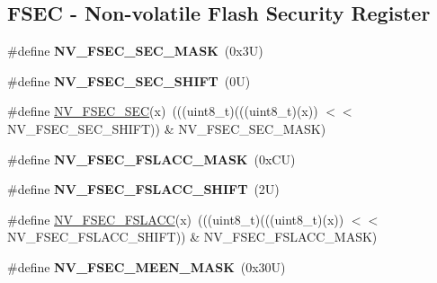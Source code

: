 \subsection*{F\+S\+EC -\/ Non-\/volatile Flash Security Register}
\begin{DoxyCompactItemize}
\item 
\mbox{\label{group___n_v___register___masks_gab159c721c6cde1f629b630c573da8ea9}} 
\#define {\bfseries N\+V\+\_\+\+F\+S\+E\+C\+\_\+\+S\+E\+C\+\_\+\+M\+A\+SK}~(0x3\+U)
\item 
\mbox{\label{group___n_v___register___masks_ga92a819b24b0472a83857ddd2d950ab08}} 
\#define {\bfseries N\+V\+\_\+\+F\+S\+E\+C\+\_\+\+S\+E\+C\+\_\+\+S\+H\+I\+FT}~(0\+U)
\item 
\#define \mbox{\hyperlink{group___n_v___register___masks_ga285ae0f5ea99f97dfae69dc7affebcde}{N\+V\+\_\+\+F\+S\+E\+C\+\_\+\+S\+EC}}(x)~(((uint8\+\_\+t)(((uint8\+\_\+t)(x)) $<$$<$ N\+V\+\_\+\+F\+S\+E\+C\+\_\+\+S\+E\+C\+\_\+\+S\+H\+I\+FT)) \& N\+V\+\_\+\+F\+S\+E\+C\+\_\+\+S\+E\+C\+\_\+\+M\+A\+SK)
\item 
\mbox{\label{group___n_v___register___masks_ga8fd3b6696c82aa96017fe25be34d19c9}} 
\#define {\bfseries N\+V\+\_\+\+F\+S\+E\+C\+\_\+\+F\+S\+L\+A\+C\+C\+\_\+\+M\+A\+SK}~(0x\+C\+U)
\item 
\mbox{\label{group___n_v___register___masks_gaba549ee99b8ca1af3531eafd5746f6b6}} 
\#define {\bfseries N\+V\+\_\+\+F\+S\+E\+C\+\_\+\+F\+S\+L\+A\+C\+C\+\_\+\+S\+H\+I\+FT}~(2\+U)
\item 
\#define \mbox{\hyperlink{group___n_v___register___masks_ga75d524350a710ba87a95c927466a42d2}{N\+V\+\_\+\+F\+S\+E\+C\+\_\+\+F\+S\+L\+A\+CC}}(x)~(((uint8\+\_\+t)(((uint8\+\_\+t)(x)) $<$$<$ N\+V\+\_\+\+F\+S\+E\+C\+\_\+\+F\+S\+L\+A\+C\+C\+\_\+\+S\+H\+I\+FT)) \& N\+V\+\_\+\+F\+S\+E\+C\+\_\+\+F\+S\+L\+A\+C\+C\+\_\+\+M\+A\+SK)
\item 
\mbox{\label{group___n_v___register___masks_ga02f5aa86e1f5bceefd0378fa736d5656}} 
\#define {\bfseries N\+V\+\_\+\+F\+S\+E\+C\+\_\+\+M\+E\+E\+N\+\_\+\+M\+A\+SK}~(0x30\+U)
\item 
\mbox{\label{group___n_v___register___masks_ga13adfbdf46af9e59b446d17ce90b49c1}} 

\end{DoxyCompactItemize}
